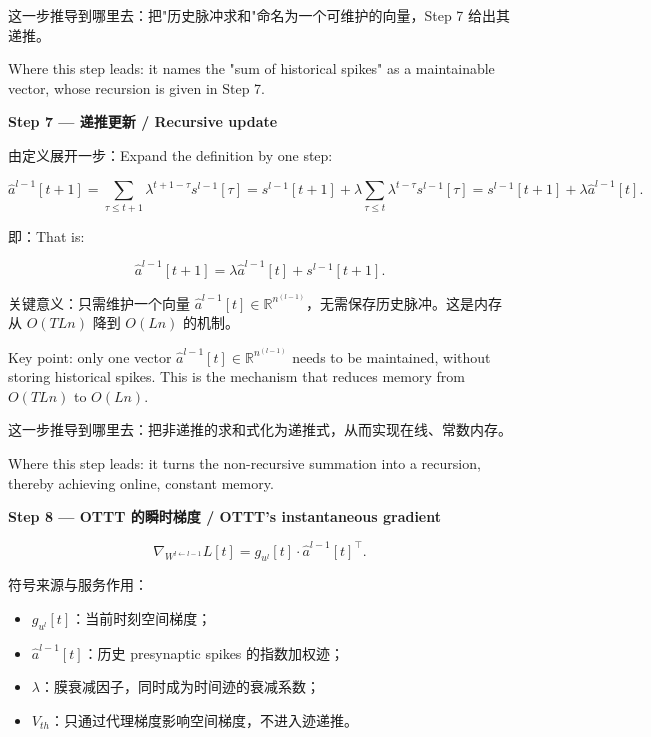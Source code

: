 \documentclass[journal,12pt,onecolumn]{IEEEtran}
\begin{document}
这一步推导到哪里去：把"历史脉冲求和"命名为一个可维护的向量，Step 7 给出其递推。

Where this step leads: it names the "sum of historical spikes" as a maintainable vector, whose recursion is given in Step 7.

\medskip\noindent\textbf{Step 7 — 递推更新 / Recursive update}

由定义展开一步：Expand the definition by one step:

\begin{equation}
\hat{a}^{l-1}[t+1] = \sum_{\tau\le t+1} \lambda^{t+1-\tau} s^{l-1}[\tau]
= s^{l-1}[t+1] + \lambda \sum_{\tau\le t} \lambda^{t-\tau} s^{l-1}[\tau]
= s^{l-1}[t+1] + \lambda \hat{a}^{l-1}[t].
\end{equation}

即：That is:

\begin{equation}
\hat{a}^{l-1}[t+1] = \lambda \hat{a}^{l-1}[t] + s^{l-1}[t+1].
\end{equation}

关键意义：只需维护一个向量 $\hat{a}^{l-1}[t]\in\mathbb R^{n^{(l-1)}}$，无需保存历史脉冲。这是内存从 $O(TLn)$ 降到 $O(Ln)$ 的机制。

Key point: only one vector $\hat{a}^{l-1}[t]\in\mathbb R^{n^{(l-1)}}$ needs to be maintained, without storing historical spikes. This is the mechanism that reduces memory from $O(TLn)$ to $O(Ln)$.

这一步推导到哪里去：把非递推的求和式化为递推式，从而实现在线、常数内存。

Where this step leads: it turns the non-recursive summation into a recursion, thereby achieving online, constant memory.

\medskip\noindent\textbf{Step 8 — OTTT 的瞬时梯度 / OTTT's instantaneous gradient}

\begin{equation}
\nabla_{W^{l\leftarrow l-1}} L[t] = g_{u^l}[t] \cdot \hat{a}^{l-1}[t]^{\top}.
\end{equation}

符号来源与服务作用：
\begin{itemize}[leftmargin=1.5em,itemsep=2pt]
\item $g_{u^l}[t]$：当前时刻空间梯度；
\item $\hat{a}^{l-1}[t]$：历史 presynaptic spikes 的指数加权迹；
\item $\lambda$：膜衰减因子，同时成为时间迹的衰减系数；
\item $V_{th}$：只通过代理梯度影响空间梯度，不进入迹递推。
\end{itemize}
\end{document}
